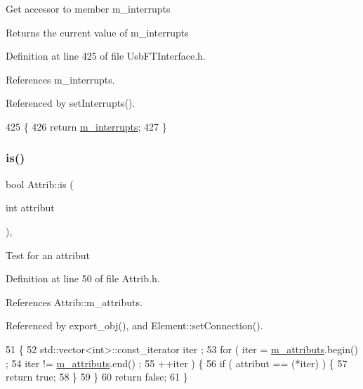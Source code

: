 Get accessor to member m\+\_\+interrupts \begin{DoxyReturn}{Returns}
the current value of m\+\_\+interrupts 
\end{DoxyReturn}


Definition at line 425 of file Usb\+F\+T\+Interface.\+h.



References m\+\_\+interrupts.



Referenced by set\+Interrupts().


\begin{DoxyCode}
425                      \{
426     \textcolor{keywordflow}{return} \hyperlink{classUsbFTInterface_a0a6e3a781ead9833a413e230c6f8d1f4}{m\_interrupts};
427   \}
\end{DoxyCode}
\mbox{\label{classAttrib_a704f26af560909ad22065083bb7d4c34}} 
\subsubsection{\texorpdfstring{is()}{is()}}
{\footnotesize\ttfamily bool Attrib\+::is (\begin{DoxyParamCaption}\item[{int}]{attribut }\end{DoxyParamCaption})\hspace{0.3cm}{\ttfamily [inline]}, {\ttfamily [inherited]}}

Test for an attribut 

Definition at line 50 of file Attrib.\+h.



References Attrib\+::m\+\_\+attributs.



Referenced by export\+\_\+obj(), and Element\+::set\+Connection().


\begin{DoxyCode}
51   \{
52     std::vector<int>::const\_iterator iter ;
53     \textcolor{keywordflow}{for} ( iter  = \hyperlink{classAttrib_ac4bd58a0cc6b38a3b711d609a3d3aacc}{m\_attributs}.begin() ;
54           iter != \hyperlink{classAttrib_ac4bd58a0cc6b38a3b711d609a3d3aacc}{m\_attributs}.end()   ;
55           ++iter ) \{
56       \textcolor{keywordflow}{if} ( attribut == (*iter) ) \{
57         \textcolor{keywordflow}{return} \textcolor{keyword}{true};
58       \}
59     \}
60     \textcolor{keywordflow}{return} \textcolor{keyword}{false};
61   \}
\end{DoxyCode}
\mbox{\label{classUsbFTInterface_a4fa70ce4a4cd4f8f01cdeb4835f11276}} 
